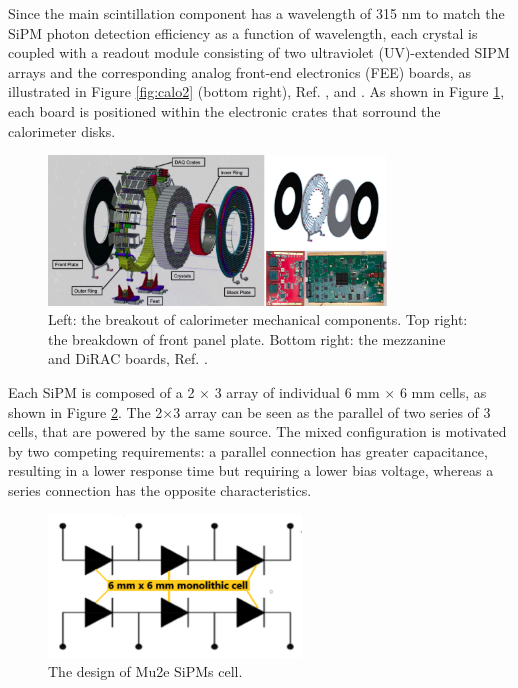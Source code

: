 Since the main scintillation component has a wavelength of 315 nm to match the SiPM
photon detection efficiency as a function of wavelength, each crystal is coupled with a readout 
module consisting of two ultraviolet (UV)-extended SIPM arrays
and the corresponding analog front-end electronics (FEE) boards, as illustrated in Figure 
\ref{fig:calo2} (bottom right), Ref. \cite{em5}, \cite{em2} and \cite{em3}. 
As shown in Figure \ref{fig:calo3}, each board is positioned within the electronic 
crates that sorround the calorimeter disks.
\begin{figure}[!h]
        \centering
        \includegraphics[width =0.8\textwidth]{figures/png/Screenshot_20240322_121017.png}
        \caption{Left: the breakout of calorimeter mechanical components. Top right: the breakdown of front
        panel plate. Bottom right: the mezzanine and DiRAC boards, Ref. \cite{em4}.}
        \label{fig:calo3}
        \end{figure}

Each SiPM is composed of a 2 $\times$ 3 array of individual 6 mm $\times$ 6 mm cells, 
as shown in Figure \ref{fig:sipmcell}. The 2$\times$3 array can be seen as 
the parallel of two series of 3 cells, that are powered by the same source. 
The mixed configuration is motivated by two competing requirements: a parallel connection 
has greater capacitance, resulting in a lower response time but requiring a lower bias voltage, 
whereas a series connection has the opposite characteristics.
\begin{figure}[!h]
    \centering
    \includegraphics[width =0.6\textwidth]{figures/png/Screenshot_20240706_141625.png}
    \caption{The design of Mu2e SiPMs cell.}
    \label{fig:sipmcell}
\end{figure}
